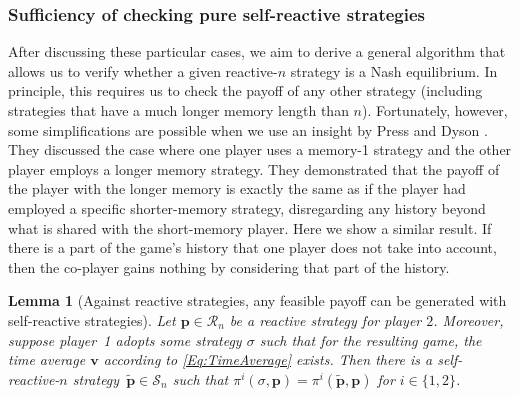 \documentclass[9pt,twoside,lineno]{pnas-new}
\theoremstyle{plainCl1}
\newtheorem{lemma}{Lemma}
\theoremstyle{plainCl2}
\begin{document}
\subsubsection*{Sufficiency of checking pure self-reactive strategies}
After discussing these particular cases, we aim to derive a general algorithm that allows us to verify whether a given reactive-$n$ strategy is a Nash equilibrium. 
In principle, this requires us to check the payoff of any other strategy (including strategies that have a much longer memory length than $n$). Fortunately, however, some simplifications are possible when we use an insight by Press and Dyson \cite{press:PNAS:2012}.
They discussed the case where one player uses a memory-1
strategy and the other player employs a longer memory strategy. They
demonstrated that the payoff of the player with the longer memory is exactly the
same as if the player had employed a specific shorter-memory strategy,
disregarding any history beyond what is shared with the short-memory player.
Here we show a similar result. 
If there is a part of the game's history that one player does not take into account, then the co-player gains nothing by
considering that part of the history. 

\begin{lemma}[Against reactive strategies, any feasible payoff can be generated with self-reactive strategies] \label{lemma:self_reactive_sufficiency}
 Let $\mathbf{p}\!\in\!\mathcal{R}_n$ be a reactive strategy for player $2$. 
 Moreover, suppose player~1 adopts some strategy $\sigma$ such that for the resulting game, the time average $\mathbf{v}$ according to \eqref{Eq:TimeAverage} exists. 
 Then there is a self-reactive-$n$ strategy~$\mathbf{\tilde p}\!\in\!\mathcal{S}_n$ such that $\pi^i(\sigma, \mathbf{p})\! = \!\pi^i(\mathbf{\tilde{p}}, \mathbf{p})$ for $i\!\in\!\{1,2\}$.
\end{lemma}
\end{document}
